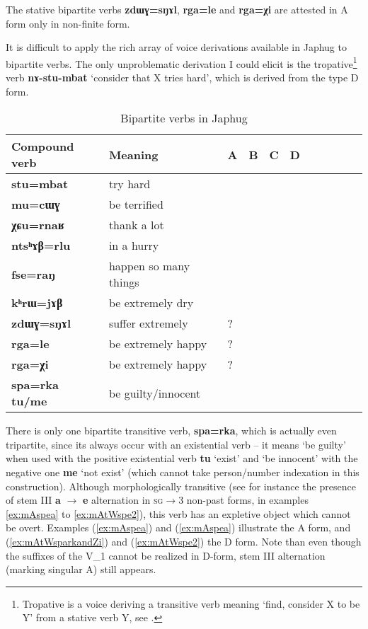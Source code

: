 \documentclass[oneside,a4paper,11pt]{article}
\newcommand{\ipa}[1]{{\phon\textbf{#1}}}
\newcommand{\Y}{\Checkmark}
\newcommand{\jpg}[2]{\ipa{#1} `#2'}
\newcommand{\refb}[1]{(\ref{#1})}
\begin{document}
The stative bipartite verbs \ipa{zdɯɣ=sŋɤl}, \ipa{rga=le} and \ipa{rga=χi} are attested in A form only in non-finite form. 

It is difficult to apply the rich array of voice derivations available in Japhug to bipartite verbs. The only unproblematic derivation I could elicit is the tropative\footnote{Tropative is a voice deriving a transitive verb meaning `find, consider X to be Y' from a stative verb Y, see \citet{jacques13tropative}.} verb \jpg{nɤ-stu-mbat}{consider that X tries hard}, which is derived from the type D form.

\begin{table}[h]
\caption{Bipartite verbs in Japhug} \label{tab:bipartite} \centering
\begin{tabular}{lllllllllll}
\toprule
Compound verb& Meaning	 & 	A & 	B & 	C & 	D & \\
\midrule
\ipa{stu=mbat} & 	try hard & 	\Y & 	\Y & 	\Y & 	\Y & 	\\	
\ipa{mu=cɯɣ} & 	be  terrified  & 	\Y & 	 & 	 & 	 & 	\\	
\ipa{χɕu=rnaʁ} & 	thank a lot & 	\Y & 	\Y & 	 & 	 & 	\\	
\ipa{ntsʰɤβ=rlu} & 	in a hurry & 	 & 	\Y & 	 & 	\Y & 	\\	
\ipa{fse=raŋ} & 	happen so many things & 	\Y & 	 & 	 & 	 & 	\\	
\ipa{kʰrɯ=jɤβ} & 	be extremely dry & 	\Y & 	 & 	 & 	\Y & 	\\	
\ipa{zdɯɣ=sŋɤl} & 	suffer extremely & 	\Y? & 	 & 	 & 	\Y & 	\\	
\ipa{rga=le} & 	be extremely happy & 	\Y? & 	\Y & 	 & 	 & 	\\	
\ipa{rga=χi} & 	be extremely happy & 	\Y? & 	\Y & 	 & 	 & 	\\	
\midrule
\ipa{spa=rka tu/me} & 	be guilty/innocent & 	\Y & 	 & 	 & 	\Y & 	\\	
\bottomrule
\end{tabular}
\end{table}

There is only one bipartite transitive verb, \ipa{spa=rka}, which is actually even tripartite, since its always occur with an existential verb -- it means `be guilty' when used with the positive existential verb \jpg{tu}{exist} and  `be innocent' with the negative one \jpg{me}{not exist} (which cannot take person/number indexation in this construction). Although morphologically transitive (see for instance the presence of stem III \ipa{a} $\rightarrow$ \ipa{e} alternation in \textsc{sg}$\rightarrow$3 non-past forms, in examples \ref{ex:mAspea} to \ref{ex:mAtWspe2}), this verb has an expletive object which cannot be overt. Examples \refb{ex:mAspea} and \refb{ex:mAspea} illustrate the A form, and \refb{ex:mAtWsparkandZi} and \refb{ex:mAtWspe2} the D form. Note than even though the suffixes of the V_1 cannot be realized in D-form, stem III alternation (marking singular A) still appears.
\end{document}
